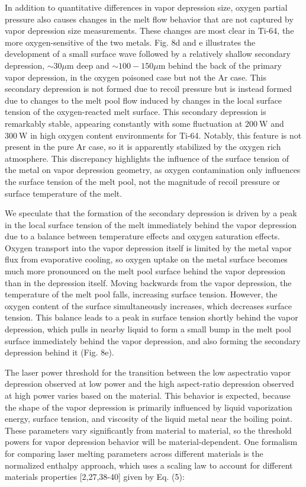 \documentclass[10pt]{article}
\begin{document}
In addition to quantitative differences in vapor depression size, oxygen partial pressure also causes changes in the melt flow behavior that are not captured by vapor depression size measurements. These changes are most clear in Ti-64, the more oxygen-sensitive of the two metals. Fig. 8d and e illustrates the development of a small surface wave followed by a relatively shallow secondary depression, $\sim 30 \mu \mathrm{m}$ deep and $\sim 100-150 \mu \mathrm{m}$ behind the back of the primary vapor depression, in the oxygen poisoned case but not the Ar case. This secondary depression is not formed due to recoil pressure but is instead formed due to changes to the melt pool flow induced by changes in the local surface tension of the oxygen-reacted melt surface. This secondary depression is remarkably stable, appearing constantly with some fluctuation at $200 \mathrm{~W}$ and $300 \mathrm{~W}$ in high oxygen content environments for Ti-64. Notably, this feature is not present in the pure Ar case, so it is apparently stabilized by the oxygen rich atmosphere. This discrepancy highlights the influence of the surface tension of the metal on vapor depression geometry, as oxygen contamination only influences the surface tension of the melt pool, not the magnitude of recoil pressure or surface temperature of the melt.

We speculate that the formation of the secondary depression is driven by a peak in the local surface tension of the melt immediately behind the vapor depression due to a balance between temperature effects and oxygen saturation effects. Oxygen transport into the vapor depression itself is limited by the metal vapor flux from evaporative cooling, so oxygen uptake on the metal surface becomes much more pronounced on the melt pool surface behind the vapor depression than in the depression itself. Moving backwards from the vapor depression, the temperature of the melt pool falls, increasing surface tension. However, the oxygen content of the surface simultaneously increases, which decreases surface tension. This balance leads to a peak in surface tension shortly behind the vapor depression, which pulls in nearby liquid to form a small bump in the melt pool surface immediately behind the vapor depression, and also forming the secondary depression behind it (Fig. 8e).

The laser power threshold for the transition between the low aspectratio vapor depression observed at low power and the high aspect-ratio depression observed at high power varies based on the material. This behavior is expected, because the shape of the vapor depression is primarily influenced by liquid vaporization energy, surface tension, and viscosity of the liquid metal near the boiling point. These parameters vary significantly from material to material, so the threshold powers for vapor depression behavior will be material-dependent. One formalism for comparing laser melting parameters across different materials is the normalized enthalpy approach, which uses a scaling law to account for different materials properties [2,27,38-40] given by Eq. (5):
\end{document}
